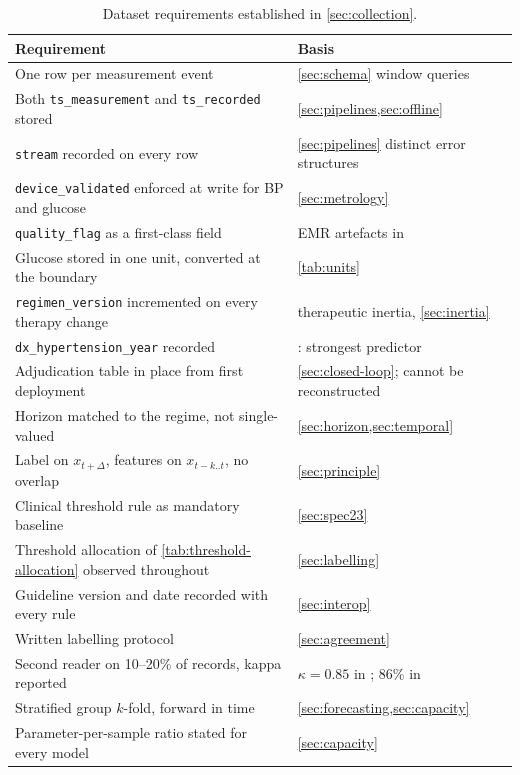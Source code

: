 \documentclass[12pt,a4paper,oneside]{report}
\begin{document}
\begin{table}[htbp]
\centering\footnotesize
\caption{Dataset requirements established in \cref{sec:collection}.}\label{tab:spec31}
\begin{tabularx}{\textwidth}{@{}X >{\raggedright\arraybackslash}p{5.5cm}@{}}
\toprule
\textbf{Requirement} & \textbf{Basis} \\
\midrule
One row per measurement event & \cref{sec:schema} window queries \\
Both \texttt{ts\_measurement} and \texttt{ts\_recorded} stored & \cref{sec:pipelines,sec:offline} \\
\texttt{stream} recorded on every row & \cref{sec:pipelines} distinct error structures \\
\texttt{device\_validated} enforced at write for BP and glucose & \cref{sec:metrology} \\
\texttt{quality\_flag} as a first-class field & EMR artefacts in \textcite{liu2025review} \\
Glucose stored in one unit, converted at the boundary & \cref{tab:units} \\
\texttt{regimen\_version} incremented on every therapy change & therapeutic inertia, \cref{sec:inertia} \\
\texttt{dx\_hypertension\_year} recorded & \textcite{mendoza2025}: strongest predictor \\
Adjudication table in place from first deployment & \cref{sec:closed-loop}; cannot be reconstructed \\
Horizon matched to the regime, not single-valued & \cref{sec:horizon,sec:temporal} \\
Label on $x_{t+\Delta}$, features on $x_{t-k..t}$, no overlap & \cref{sec:principle} \\
Clinical threshold rule as mandatory baseline & \cref{sec:spec23} \\
Threshold allocation of \cref{tab:threshold-allocation} observed throughout & \cref{sec:labelling} \\
Guideline version and date recorded with every rule & \cref{sec:interop} \\
Written labelling protocol & \cref{sec:agreement} \\
Second reader on 10--20\% of records, kappa reported & $\kappa = 0.85$ in \textcite{alessa2019}; 86\% in \textcite{dodoo2022} \\
Stratified group $k$-fold, forward in time & \cref{sec:forecasting,sec:capacity} \\
Parameter-per-sample ratio stated for every model & \cref{sec:capacity} \\

\end{tabularx}
\end{table}
\end{document}
